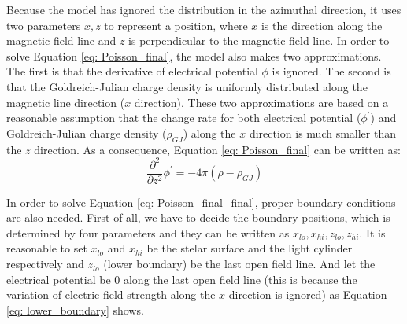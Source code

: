 \documentclass[12pt]{report}
\newcommand{\gj}[0]{
  Goldreich-Julian charge density
}
\begin{document}
    Because the model has ignored the distribution in the azimuthal direction, it uses two 
    parameters $x, z$ to represent a position, where $x$ is the direction along the magnetic 
    field line and $z$ is perpendicular to the magnetic field line. In order to solve 
    Equation \ref{eq: Poisson_final}, the model also makes two approximations. The first is that 
    the derivative of electrical potential $\phi$ is ignored. The second is that the \gj{} 
    is uniformly distributed along the magnetic line direction ($x$ direction). These two 
    approximations are based on a reasonable assumption that the change rate 
    for both electrical potential ($\phi^{\prime}$) and \gj{}($\rho_{GJ}$) along the $x$ 
    direction is much smaller than the $z$ direction. 
    As a consequence, Equation \ref{eq: Poisson_final} can be written as: 
    \begin{equation}
      \label{eq: Poisson_final_final}
      \frac{\partial^2}{\partial z^2} \phi^{\prime} = -4\pi\left(\rho - \rho_{GJ} \right)
    \end{equation}

    In order to solve Equation \ref{eq: Poisson_final_final}, proper boundary conditions are also 
    needed. First of all, we have to decide the boundary positions, which is determined by 
    four parameters and they can be written as $x_{lo}, x_{hi}, z_{lo}, z_{hi}$. It is 
    reasonable to set $x_{lo}$ and $x_{hi}$ be the stelar surface and the light cylinder 
    respectively and $z_{lo}$ (lower boundary) be the last open field line. And let the 
    electrical potential be $0$ along the last open field line (this is because the 
    variation of electric field strength along the $x$ direction is ignored) as Equation 
    \ref{eq: lower_boundary} shows.  
\end{document}
